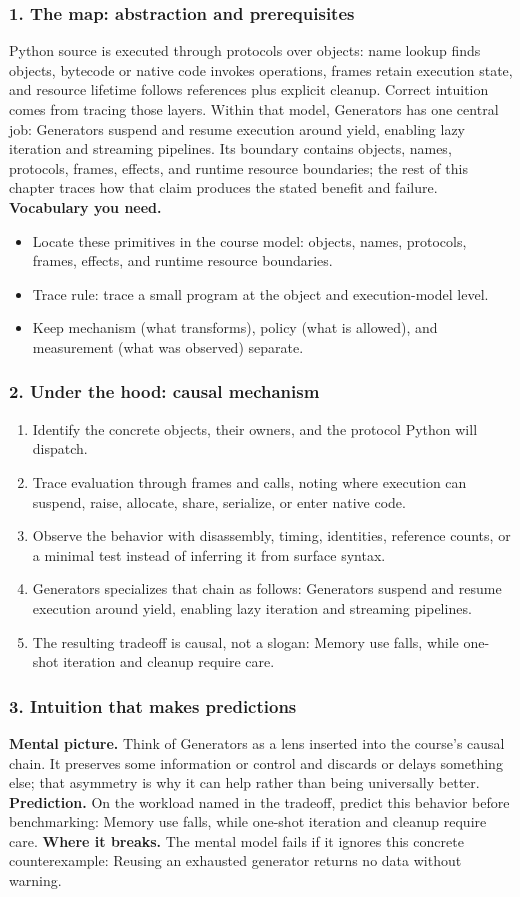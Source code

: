 \subsubsection*{1. The map: abstraction and prerequisites}
Python source is executed through protocols over objects: name lookup finds objects, bytecode or native code invokes operations, frames retain execution state, and resource lifetime follows references plus explicit cleanup. Correct intuition comes from tracing those layers.
Within that model, Generators has one central job: Generators suspend and resume execution around yield, enabling lazy iteration and streaming pipelines. Its boundary contains objects, names, protocols, frames, effects, and runtime resource boundaries; the rest of this chapter traces how that claim produces the stated benefit and failure.
\textbf{Vocabulary you need.}\begin{itemize}
\item Locate these primitives in the course model: objects, names, protocols, frames, effects, and runtime resource boundaries.
\item Trace rule: trace a small program at the object and execution-model level.
\item Keep mechanism (what transforms), policy (what is allowed), and measurement (what was observed) separate.
\end{itemize}
\subsubsection*{2. Under the hood: causal mechanism}\begin{enumerate}
\item Identify the concrete objects, their owners, and the protocol Python will dispatch.
\item Trace evaluation through frames and calls, noting where execution can suspend, raise, allocate, share, serialize, or enter native code.
\item Observe the behavior with disassembly, timing, identities, reference counts, or a minimal test instead of inferring it from surface syntax.
\item Generators specializes that chain as follows: Generators suspend and resume execution around yield, enabling lazy iteration and streaming pipelines.
\item The resulting tradeoff is causal, not a slogan: Memory use falls, while one-shot iteration and cleanup require care.
\end{enumerate}
\subsubsection*{3. Intuition that makes predictions}
\textbf{Mental picture.} Think of Generators as a lens inserted into the course's causal chain. It preserves some information or control and discards or delays something else; that asymmetry is why it can help rather than being universally better.
\textbf{Prediction.} On the workload named in the tradeoff, predict this behavior before benchmarking: Memory use falls, while one-shot iteration and cleanup require care.
\textbf{Where it breaks.} The mental model fails if it ignores this concrete counterexample: Reusing an exhausted generator returns no data without warning.
